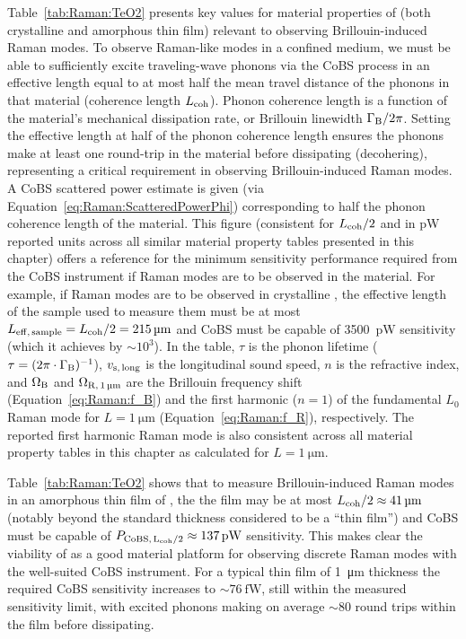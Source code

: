 Table~\ref{tab:Raman:TeO2} presents key values for material properties of  (both crystalline and amorphous thin film) relevant to observing Brillouin-induced Raman modes. To observe Raman-like modes in a confined medium, we must be able to sufficiently excite traveling-wave phonons via the \ac{CoBS} process in an effective length equal to at most half the mean travel distance of the phonons in that material (coherence length \(L_{\rm coh}\)). Phonon coherence length is a function of the material's mechanical dissipation rate, or Brillouin linewidth \(\Gamma_{\rm B}/2\pi\). Setting the effective length at half of the phonon coherence length ensures the phonons make at least one round-trip in the material before dissipating (decohering), representing a critical requirement in observing Brillouin-induced Raman modes. A \ac{CoBS} scattered power estimate is given (via Equation~\ref{eq:Raman:ScatteredPowerPhi}) corresponding to half the phonon coherence length of the material. This figure (consistent for \(L_{\rm coh}/2\) and in \si{\pico\watt} reported units across all similar material property tables presented in this chapter) offers a reference for the minimum sensitivity performance required from the \ac{CoBS} instrument if Raman modes are to be observed in the material. For example, if Raman modes are to be observed in crystalline , the effective length of the sample used to measure them must be at most \(L_{\rm eff,\,sample} = L_{\rm coh}/2 = \SI{215}{\micro\meter}\) and \ac{CoBS} must be capable of \SI{3500}{\pico\watt} sensitivity (which it achieves by \(\sim10^{3}\)). In the table, \(\tau\) is the phonon lifetime (\(\tau = (2\pi\cdot\Gamma_{\rm B})^{-1}\)), \(v_{\rm s,\,long}\) is the longitudinal sound speed, \(n\) is the refractive index, and \(\Omega_{\rm B}\) and \(\Omega_{\rm R,\,\SI{1}{\micro\meter}}\) are the Brillouin frequency shift (Equation~\ref{eq:Raman:f_B}) and the first harmonic (\(n = 1\)) of the fundamental \(L_{0}\) Raman mode for \(L = \SI{1}{\micro\meter}\) (Equation~\ref{eq:Raman:f_R}), respectively. The reported first harmonic Raman mode is also consistent across all material property tables in this chapter as calculated for \(L = \SI{1}{\micro\meter}\).

Table~\ref{tab:Raman:TeO2} shows that to measure Brillouin-induced Raman modes in an amorphous thin film of , the the film may be at most \(L_{\rm coh}/2 \approx \SI{41}{\micro\meter}\) (notably beyond the standard thickness considered to be a ``thin film'') and \ac{CoBS} must be capable of \(P_{\rm CoBS,\,L_{\rm coh}/2} \approx \SI{137}{\pico\watt}\) sensitivity. This makes clear the viability of  as a good material platform for observing discrete Raman modes with the well-suited \ac{CoBS} instrument. For a typical thin film of \SI{1}{\micro\meter} thickness the required \ac{CoBS} sensitivity increases to \(\sim\SI{76}{\femto\watt}\), still within the measured sensitivity limit, with excited phonons making on average \(\sim\)80 round trips within the film before dissipating.

